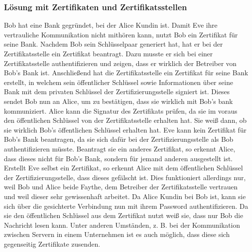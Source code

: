\clearpage

\subsubsection{Lösung mit Zertifikaten und Zertifikatsstellen}

Bob hat eine Bank gegründet, bei der Alice Kundin ist. Damit Eve ihre vertrauliche Kommunikation
nicht mithören kann, nutzt Bob ein Zertifikat für seine Bank.
Nachdem Bob sein Schlüsselpaar generiert hat, hat er bei der Zertifikatsstelle ein Zertifikat
beantragt. Dazu musste er sich bei einer Zertifikatsstelle authentifizieren und zeigen, dass er
wirklich der Betreiber von Bob's Bank ist. Anschließend hat die Zertifikatsstelle ein
Zertifikat für seine Bank erstellt, in welchem sein öffentlicher Schlüssel sowie Informationen
über seine Bank mit dem privaten Schlüssel der Zertifizierungsstelle signiert ist.
Dieses sendet Bob nun an Alice, um zu bestätigen, dass sie wirklich mit Bob's bank kommuniziert.
Alice kann die Signatur des Zertifikats prüfen, da sie im voraus den öffentlichen Schlüssel
von der Zertifikatsstelle erhalten hat. Sie weiß dann, ob sie wirklich Bob's öffentlichen
Schlüssel erhalten hat. Eve kann kein Zertifikat für Bob's Bank beantragen, da sie sich
dafür bei der Zertifizierungsstelle als Bob authentifizieren müsste.
Beantragt sie ein anderes Zertifikat, so erkennt Alice, dass dieses nicht für Bob's Bank,
sondern für jemand anderen ausgestellt ist.
Erstellt Eve selbst ein Zertifikat, so erkennt Alice mit dem öffentlichen Schlüssel der
Zertifizierungsstelle, dass dieses gefälscht ist.
Dies funktioniert allerdings nur, weil Bob und Alice beide Faythe, dem Betreiber
der Zertifikatsstelle vertrauen und weil dieser sehr gewissenhaft arbeitet.
Da Alice Kundin bei Bob ist, kann sie sich über die gesichterte Verbindung nun mit ihrem
Password authentifizieren. Da sie den öffentlichen Schlüssel aus dem Zertifikat nutzt weiß sie,
dass nur Bob die Nachricht lesen kann.
Unter anderen Umständen, z. B. bei der Kommunikation zwischen Servern in einem Unternehmen
ist es auch möglich, dass diese sich gegenseitig Zertifikate zusenden.

\clearpage

\vspace*{2.5cm}

